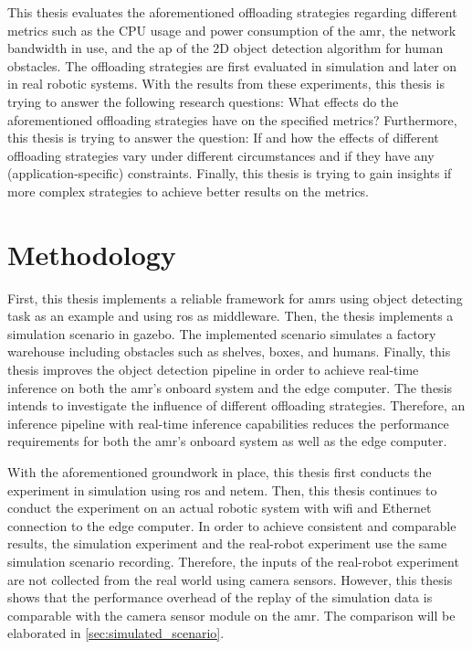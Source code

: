 This thesis evaluates the aforementioned offloading strategies regarding different metrics such as the CPU usage and power consumption of the \gls{amr}, the network bandwidth in use, and the \gls{ap} of the 2D object detection algorithm for human obstacles. The offloading strategies are first evaluated in simulation and later on in real robotic systems. With the results from these experiments, this thesis is trying to answer the following research questions: What effects do the aforementioned offloading strategies have on the specified metrics? Furthermore, this thesis is trying to answer the question: If and how the effects of different offloading strategies vary under different circumstances and if they have any (application-specific) constraints. Finally, this thesis is trying to gain insights if more complex strategies to achieve better results on the metrics. 

\section{Methodology}\label{sec:introduction:methodology}

First, this thesis implements a reliable framework for \glspl{amr} using object detecting task as an example and using \gls{ros} as middleware. Then, the thesis implements a simulation scenario in \gls{gazebo}. The implemented scenario simulates a factory warehouse including obstacles such as shelves, boxes, and humans. Finally, this thesis improves the object detection pipeline in order to achieve real-time inference on both the \gls{amr}'s onboard system and the edge computer. The thesis intends to investigate the influence of different offloading strategies. Therefore, an inference pipeline with real-time inference capabilities reduces the performance requirements for both the \gls{amr}'s onboard system as well as the edge computer.

With the aforementioned groundwork in place, this thesis first conducts the experiment in simulation using \gls{ros} and \gls{netem}. Then, this thesis continues to conduct the experiment on an actual robotic system with \gls{wifi} and Ethernet connection to the edge computer. In order to achieve consistent and comparable results, the simulation experiment and the real-robot experiment use the same simulation scenario recording. Therefore, the inputs of the real-robot experiment are not collected from the real world using camera sensors. However, this thesis shows that the performance overhead of the replay of the simulation data is comparable with the camera sensor module on the \gls{amr}. The comparison will be elaborated in \cref{sec:simulated_scenario}. 

